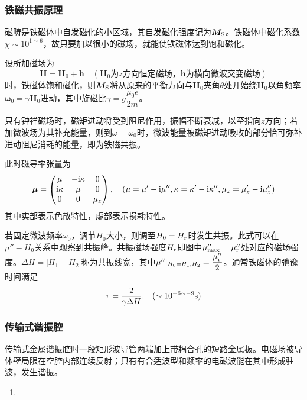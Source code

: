 	\subsubsection{铁磁共振原理} %
		\label{ssub:铁磁共振原理}
		\par 磁畴是铁磁体中自发磁化的小区域，其自发磁化强度记为$\boldsymbol{M}_{\rm S}$。铁磁体中磁化系数$\chi\sim 10^{1\sim 6}$，故只要加以很小的磁场，就能使铁磁体达到饱和磁化。
		\par 设所加磁场为
		\begin{equation}
			\boldsymbol{H}=\boldsymbol{H}_0+\boldsymbol{h}\quad (\boldsymbol{H}_0\text{为}z\text{方向恒定磁场，}\boldsymbol{h}\text{为横向微波交变磁场})
		\end{equation}
		时，铁磁体饱和磁化，则$\boldsymbol{M}_{\rm S}$将从原来的平衡方向与$\boldsymbol{H}_0$夹角$\theta$处开始绕$\boldsymbol{H}_0$以角频率$\boldsymbol{\omega}_0=\gamma\boldsymbol{H}_0$进动，其中旋磁比$\gamma = g\dfrac{\mu_0 e}{2m}$。
		\par 只有钟祥磁场时，磁矩进动将受到阻尼作用，振幅不断衰减，以至指向$z$方向；若加微波场为其补充能量，则到$\omega = \omega_0$时，微波能量被磁矩进动吸收的部分恰可弥补进动阻尼消耗的能量，即为铁磁共振。
		\par 此时磁导率张量为
		\begin{equation}
			\boldsymbol{\mu}=
			\begin{pmatrix}
				\mu & -\mathrm{i}\kappa & 0 \\
				\mathrm{i}\kappa & \mu & 0 \\
				 0 & 0 & \mu_z \\
			\end{pmatrix},
			\quad (\mu = \mu'-{\rm i}\mu'',\kappa = \kappa'-{\rm i}\kappa'',\mu_z = \mu_z'-{\rm i}\mu_z'')
		\end{equation}
		其中实部表示色散特性，虚部表示损耗特性。
		\par 若固定微波频率$\omega_0$，调节$H_0$大小，则调至$H_0=H_{\rm r}$时发生共振。此式可以在$\mu''-H_0$关系中观察到共振峰。共振磁场强度$H_{\rm r}$即图中$\mu''_{\rm max}=\mu''_{\rm r}$处对应的磁场强度。$\Delta H = |H_1-H_2|$称为共振线宽，其中$\mu''|_{H_0=H_1,H_2}=\dfrac{\mu''_{\rm r}}{2}$。通常铁磁体的弛豫时间满足
		\begin{equation}
			\tau = \dfrac{2}{\gamma \Delta H}.\quad (\sim 10^{-6 \sim -9}{\rm s})
		\end{equation}
	\subsubsection{传输式谐振腔} %
		\label{ssub:传输式谐振腔}
		\par 传输式金属谐振腔时一段矩形波导管两端加上带耦合孔的短路金属板。电磁场被导体壁局限在空腔内部连续反射；只有有合适波型和频率的电磁波能在其中形成驻波，发生谐振。
		\begin{enumerate}
			\item 
		\end{enumerate}
